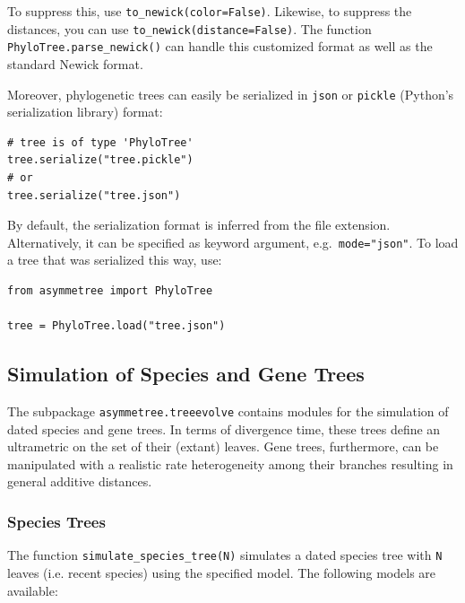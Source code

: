 \documentclass[hidelinks,11pt]{article}
\begin{document}
\noindent
To suppress this, use \texttt{to\_newick(color=False)}. Likewise, to suppress the distances, you can use \texttt{to\_newick(distance=False)}.
The function \texttt{PhyloTree.parse\_newick()} can handle this customized format as well as the standard Newick format.

Moreover, phylogenetic trees can easily be serialized in \texttt{json} or \texttt{pickle} (Python's serialization library) format:

\begin{adjustwidth}{1cm}{1cm}\vspace{2mm}
\begin{verbatim}
# tree is of type 'PhyloTree'
tree.serialize("tree.pickle")
# or
tree.serialize("tree.json")
\end{verbatim}
\end{adjustwidth}

\noindent
By default, the serialization format is inferred from the file extension.
Alternatively, it can be specified as keyword argument, e.g.\ \texttt{mode="json"}.
To load a tree that was serialized this way, use:

\begin{adjustwidth}{1cm}{1cm}\vspace{2mm}
\begin{verbatim}
from asymmetree import PhyloTree

tree = PhyloTree.load("tree.json")
\end{verbatim}
\end{adjustwidth}

\subsection{Simulation of Species and Gene Trees}

The subpackage \texttt{asymmetree.treeevolve} contains modules for the simulation of dated species and gene trees.
In terms of divergence time, these trees define an ultrametric on the set of their (extant) leaves.
Gene trees, furthermore, can be manipulated with a realistic rate heterogeneity among their branches resulting in general additive distances.


\subsubsection{Species Trees}

The function \texttt{simulate\_species\_tree(N)} simulates a dated species tree with \texttt{N} leaves (i.e. recent species) using the specified model.
The following models are available:
\end{document}
